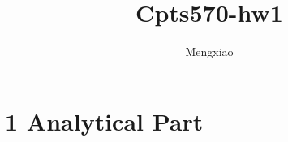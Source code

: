 \documentclass{article}
\author{Mengxiao}
\title{Cpts570-hw1}
\begin{document}
    \maketitle
    \pagebreak
    \section{1 Analytical Part} 
        \subsection{}
\end{document}
